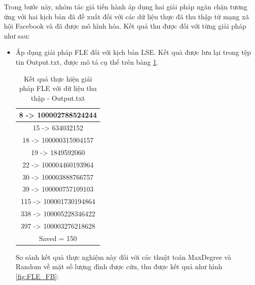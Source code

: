 Trong bước này, nhóm tác giả tiến hành áp dụng hai giải pháp ngăn chặn tương ứng với hai kịch bản đã đề xuất đối với các dữ liệu thực đã thu thập từ mạng xã hội Facebook và đã được mô hình hóa. Kết quả thu được đối với từng giải pháp như sau:

\begin{itemize}
	\item Áp dụng giải pháp FLE đối với kịch bản LSE. Kết quả được lưu lại trong tệp tin Output.txt, được mô tả cụ thể trên bảng \ref{bang4_6}.
	\begin{table} [!htp]
		\centering
		\begin{tabular}{|c|}
			\hline
			8 -> 100002788524244\\
			\hline
			15 -> 634032152\\
			\hline
			18 -> 100000315904157\\
			\hline
			19 -> 1849592060\\
			\hline
			22 -> 100004460193964\\
			\hline
			30 -> 100003888766757\\
			\hline
			39 -> 100000757109103\\
			\hline
			115 -> 100001730194864\\
			\hline
			338 -> 100005228346422\\
			\hline
			397 -> 100003276218628\\
			\hline
			Saved = 150\\
			\hline 
		\end{tabular}
		\caption{Kết quả thực hiện giải pháp FLE với dữ liệu thu thập - Output.txt}
		\label{bang4_6} 
	\end{table}
	
	So sánh kết quả thực nghiệm này đối với các thuật toán MaxDegree và Random về mặt số lượng đỉnh được cứu, thu được kết quả như hình \ref{fig:FLE_FB}:
	

\end{itemize}
